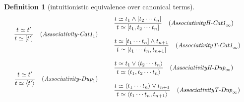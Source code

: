 \documentclass[12pt]{article}
\newtheorem{Definition}{Definition}[section]
\begin{document}
\begin{Definition}[intuitionistic equivalence over canonical terms]
\begin{displaymath}
\begin{array}{c}
      \begin{array}{ll}
        \begin{array}{rl}
          \dfrac{ t \simeq t' }{ t \simeq [t'] }
          & (\text{\it Associativity-Cat1}_1)
        \end{array}
        & \begin{array}[c]{l}
            \begin{array}{rl}
              \dfrac{
                t \simeq t_1 \wedge [t_2 \cdots t_n ]
              }{
                t \simeq [t_1, t_2 \cdots t_n ]
              }  &  (\text{\it AssociativityH-Cat1}_\infty)
            \end{array}  \\
            \\
            \begin{array}{rl}
              \dfrac{
                t \simeq [t_1 \cdots t_n ] \wedge t_{n+1}
              }{
                t \simeq [t_1 \cdots t_n, t_{n+1} ]
              }  &  (\text{\it AssociativityT-Cat1}_\infty)
            \end{array}
          \end{array}
      \end{array}  \\
      \\

      \begin{array}{ll}
        \begin{array}{rl}
          \dfrac{ t \simeq t' }{ t \simeq \langle t' \rangle }
          & (\text{\it Associativity-Dup}_1)
        \end{array}
        & \begin{array}[c]{l}
            \begin{array}{rl}
              \dfrac{
                t \simeq t_1 \vee \langle t_2 \cdots t_n \rangle
              }{
                t \simeq \langle t_1, t_2 \cdots t_n \rangle
              }  &  (\text{\it AssociativityH-Dup}_\infty)
            \end{array}  \\
            \\
            \begin{array}{rl}
              \dfrac{
                t \simeq \langle t_1 \cdots t_n \rangle \vee t_{n+1}
              }{
                t \simeq \langle t_1 \cdots t_n, t_{n+1} \rangle
              }  &  (\text{\it AssociativityT-Dup}_\infty)
            \end{array}
          \end{array}
      \end{array}  \\
      \\
      

\end{array}
\end{displaymath}
\end{Definition}
\end{document}
